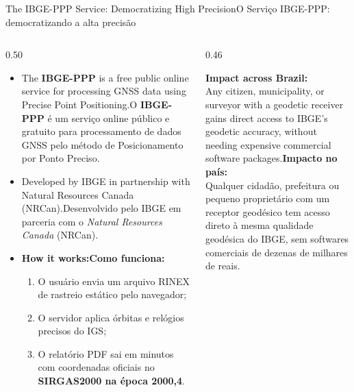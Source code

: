 \documentclass[aspectratio=169,11pt]{beamer}
\newcommand{\tr}[2]{\ifEN#2\else#1\fi}
\newcommand{\bnum}[1]{\ifmmode\textcolor{mTeal}{\mathbf{#1}}\else\textbf{\textcolor{mTeal}{#1}}\fi}
\begin{document}
\begin{frame}{\tr{O Serviço IBGE-PPP: democratizando a alta precisão}{The IBGE-PPP Service: Democratizing High Precision}}
  \begin{columns}[onlytextwidth]
    \begin{column}{0.50\textwidth}
      \begin{itemize}
        \setlength{\itemsep}{4pt}
        \scriptsize
        \item \tr{O \textbf{IBGE-PPP} é um serviço online público e gratuito para processamento de
              dados GNSS pelo método de Posicionamento por Ponto Preciso.}{The \textbf{IBGE-PPP} is
              a free public online service for processing GNSS data using Precise Point Positioning.}
        \item \tr{Desenvolvido pelo IBGE em parceria com o \emph{Natural Resources Canada} (NRCan).}{
              Developed by IBGE in partnership with Natural Resources Canada (NRCan).}
        \item \tr{\textbf{Como funciona:}}{ \textbf{How it works:}}
              \begin{enumerate}
                \tiny
                \item O usuário envia um arquivo RINEX de rastreio estático pelo navegador;
                \item O servidor aplica órbitas e relógios precisos do IGS;
                \item O relatório PDF sai em minutos com coordenadas oficiais no \bnum{SIRGAS2000 na
                      época 2000,4}.
              \end{enumerate}
      \end{itemize}
    \end{column}
    \begin{column}{0.46\textwidth}
      \begin{regra}
        \scriptsize
        \tr{\textbf{Impacto no país:}\\[3pt]
        Qualquer cidadão, prefeitura ou pequeno proprietário com um receptor geodésico tem acesso
        direto à mesma qualidade geodésica do IBGE, sem softwares comerciais de dezenas de milhares
        de reais.}{\textbf{Impact across Brazil:}\\[3pt]
        Any citizen, municipality, or surveyor with a geodetic receiver gains direct access to
        IBGE's geodetic accuracy, without needing expensive commercial software packages.}
      \end{regra}
    \end{column}
  \end{columns}
\end{frame}
\end{document}
